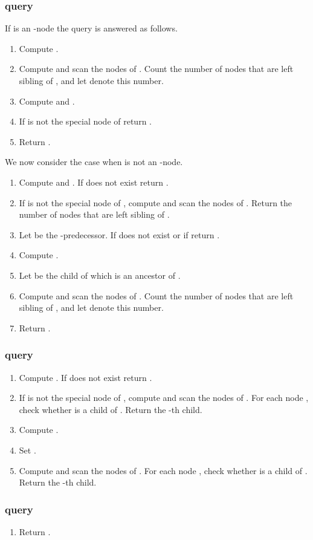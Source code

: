 \documentclass[12pt]{article}
\begin{document}
\subsubsection{ query}
If  is an -node the query is answered as follows.
\begin{enumerate}
\item
Compute .
\item
Compute  and scan the nodes of .
Count the number of nodes that are left sibling of ,
and let  denote this number.
\item
Compute  and .
\item
If  is not the special node of  return .
\item
Return .
\end{enumerate}
We now consider the case when  is not an -node.
\begin{enumerate}
\item
Compute  and .
If  does not exist return .
\item
If  is not the special node of ,
compute  and scan the nodes of .
Return the number of nodes that are left sibling of .
\item
Let  be the -predecessor.
If  does not exist or if 
return .
\item
Compute .
\item
Let  be the child of  which is an ancestor of .
\item
Compute  and scan the nodes of .
Count the number of nodes that are left sibling of ,
and let  denote this number.
\item
Return .
\end{enumerate}

\subsubsection{ query}
\begin{enumerate}
\item
Compute .
If  does not exist return .
\item
If  is not the special node of , compute  and scan the nodes of .
For each node , check whether  is a child of .
Return the -th child.
\item
Compute .
\item
Set .
\item
Compute  and scan the nodes of .
For each node , check whether  is a child of .
Return the -th child.
\end{enumerate}

\subsubsection{ query}
\begin{enumerate}
\item
Return .
\end{enumerate}





\end{document}

